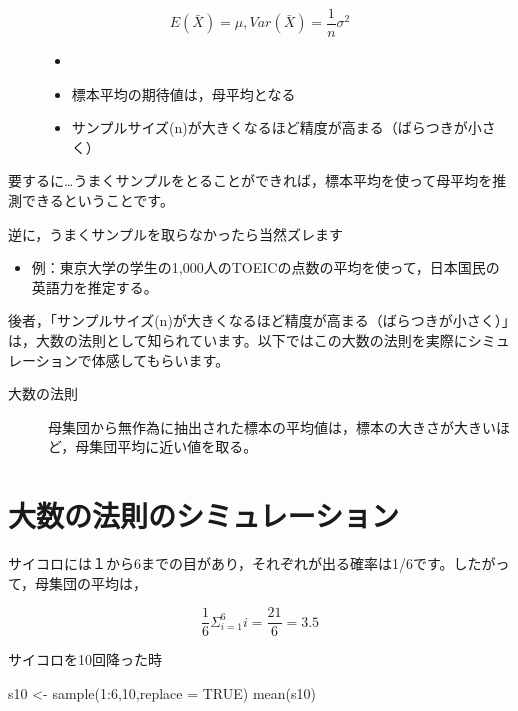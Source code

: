 \documentclass[
  letterpaper,
  DIV=11,
  numbers=noendperiod]{scrreprt}
\newenvironment{Shaded}{\begin{snugshade}}{\end{snugshade}}
\newcommand{\AttributeTok}[1]{\textcolor[rgb]{0.40,0.45,0.13}{#1}}
\newcommand{\ConstantTok}[1]{\textcolor[rgb]{0.56,0.35,0.01}{#1}}
\newcommand{\DecValTok}[1]{\textcolor[rgb]{0.68,0.00,0.00}{#1}}
\newcommand{\FunctionTok}[1]{\textcolor[rgb]{0.28,0.35,0.67}{#1}}
\newcommand{\NormalTok}[1]{\textcolor[rgb]{0.00,0.23,0.31}{#1}}
\newcommand{\OtherTok}[1]{\textcolor[rgb]{0.00,0.23,0.31}{#1}}
\newcommand{\SpecialCharTok}[1]{\textcolor[rgb]{0.37,0.37,0.37}{#1}}
\providecommand{\tightlist}{%
  \setlength{\itemsep}{0pt}\setlength{\parskip}{0pt}}\usepackage{longtable,booktabs,array}
\begin{document}
\begin{description}
\item[\[E(\bar X) = \mu, Var(\bar X) = \frac{1}{n}\sigma^2\]]
\begin{itemize}
\item[]
\item
  標本平均の期待値は，母平均となる
\item
  サンプルサイズ(n)が大きくなるほど精度が高まる（ばらつきが小さく）
\end{itemize}
\end{description}

要するに\ldots うまくサンプルをとることができれば，標本平均を使って母平均を推測できるということです。

逆に，うまくサンプルを取らなかったら当然ズレます

\begin{itemize}
\tightlist
\item
  例：東京大学の学生の1,000人のTOEICの点数の平均を使って，日本国民の英語力を推定する。
\end{itemize}

後者，「サンプルサイズ(n)が大きくなるほど精度が高まる（ばらつきが小さく）」は，大数の法則として知られています。以下ではこの大数の法則を実際にシミュレーションで体感してもらいます。

\begin{description}
\item[大数の法則]
母集団から無作為に抽出された標本の平均値は，標本の大きさが大きいほど，母集団平均に近い値を取る。
\end{description}

\hypertarget{ux5927ux6570ux306eux6cd5ux5247ux306eux30b7ux30dfux30e5ux30ecux30fcux30b7ux30e7ux30f3}{%
\section{大数の法則のシミュレーション}\label{ux5927ux6570ux306eux6cd5ux5247ux306eux30b7ux30dfux30e5ux30ecux30fcux30b7ux30e7ux30f3}}

サイコロには１から6までの目があり，それぞれが出る確率は1/6です。したがって，母集団の平均は，

\[
\frac{1}{6}\Sigma^6_{i=1}i=\frac{21}{6}=3.5
\]

サイコロを10回降った時

\begin{Shaded}
\begin{Highlighting}[]
\NormalTok{s10 }\OtherTok{\textless{}{-}} \FunctionTok{sample}\NormalTok{(}\DecValTok{1}\SpecialCharTok{:}\DecValTok{6}\NormalTok{,}\DecValTok{10}\NormalTok{,}\AttributeTok{replace =} \ConstantTok{TRUE}\NormalTok{)}
\FunctionTok{mean}\NormalTok{(s10)}
\end{Highlighting}
\end{Shaded}
\end{document}

